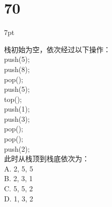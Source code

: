 \documentclass[UTF8]{report}
\theoremstyle{MyLineTheoremStyle} %
\theoremstyle{MyBlockTheoremStyle} %
\theoremstyle{MySubsubsectionStyle} %
\newenvironment{graybox}{%
        \def\FrameCommand{%
        \hspace{1pt}%
        {\color{gray}\small \vrule width 2pt}%
        {\color{graybox_color}\vrule width 4pt}%
        \colorbox{graybox_color}%
        }%
        \MakeFramed{\advance\hsize-\width\FrameRestore}%
        \noindent\hspace{-4.55pt}%
        \begin{adjustwidth}{}{7pt}%
        \vspace{2pt}\vspace{2pt}%
        }
        {%
        \vspace{2pt}\end{adjustwidth}\endMakeFramed%
        }
\begin{document}
\section*{70}
\begin{graybox}
栈初始为空，依次经过以下操作：\\
push(5);\\
push(8);\\
pop();\\
push(5);\\
top();\\
push(1);\\
push(3);\\
pop();\\
pop();\\
push(2);\\
此时从栈顶到栈底依次为：\\
A. 2, 5, 5 \\
B. 2, 3, 1 \\
C. 5, 5, 2 \\
D. 1, 3, 2
\end{graybox}
\end{document}
